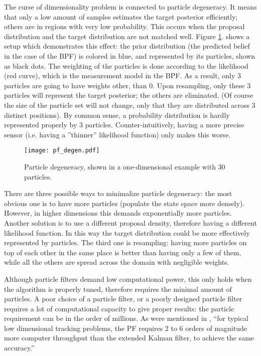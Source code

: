 The curse of dimensionality problem is connected to particle degeneracy. It means that only a low amount of samples estimates the target posterior efficiently; others are in regions with very low probability. This occurs when the proposal distribution and the target distribution are not matched well. Figure \ref{fig:pf-degen}. shows a setup which demonstrates this effect: the prior distribution (the predicted belief in the case of the BPF) is colored in blue, and represented by its particles, shown as black dots. The weighting of the particles is done according to the likelihood (red curve), which is the measurement model in the BPF. As a result, only 3 particles are going to have weights other, than 0. Upon resampling, only these 3 particles will represent the target posterior; the others are eliminated. (Of course the size of the particle set will not change, only that they are distributed across 3 distinct positions). By common sense, a probability distribution is hardly represented properly by 3 particles. Counter-intuitively, having a more precise sensor (i.e. having a ''thinner'' likelihood function) only makes this worse.

\begin{figure}[htb!]
  \centering
  \texttt{[image: pf\_degen.pdf]}
  \caption{Particle degeneracy, shown in a one-dimensional example with 30 particles.}
  \label{fig:pf-degen}
\end{figure}
There are three possible ways to minimalize particle degeneracy: the most obvious one is to have more particles (populate the state space more densely). However, in higher dimensions this demands exponentially more particles. Another solution is to use a different proposal density, therefore having a different likelihood function. In this way the target distribution could be more effectively represented by particles. The third one is resampling: having more particles on top of each other in the same place is better than having only a few of them, while all the others are spread across the domain with negligible weights.


Although particle filters demand low computational power, this only holds when the algorithm is properly tuned, therefore requires the minimal amount of particles. A poor choice of a particle filter, or a poorly designed particle filter requires a lot of computational capacity to give proper results: the particle requirement can be in the order of millions. As were mentioned in \cite{Daum2003}, ``for typical low dimensional tracking problems, the PF requires 2 to 6 orders of magnitude more computer throughput than the extended Kalman filter, to achieve the same accuracy.''

